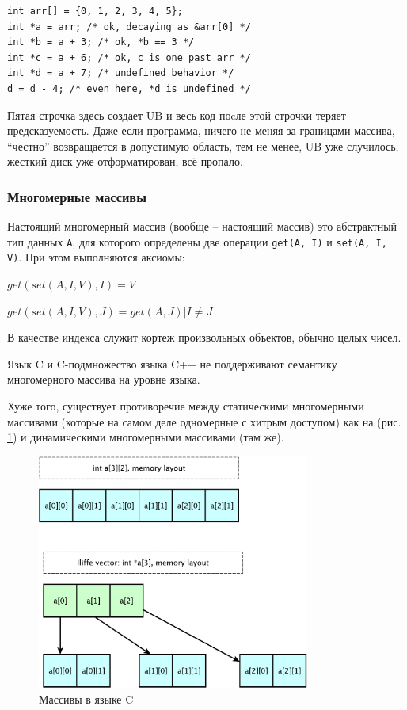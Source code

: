 \documentclass[a4paper,12pt,oneside]{article}
\begin{document}
\begin{lstlisting}
int arr[] = {0, 1, 2, 3, 4, 5};
int *a = arr; /* ok, decaying as &arr[0] */
int *b = a + 3; /* ok, *b == 3 */
int *c = a + 6; /* ok, c is one past arr */
int *d = a + 7; /* undefined behavior */
d = d - 4; /* even here, *d is undefined */
\end{lstlisting}

Пятая строчка здесь создает UB и весь код поcле этой строчки теряет предсказуемость. Даже если программа, ничего не меняя за границами массива, ``честно'' возвращается в допустимую область, тем не менее, UB уже случилось, жесткий диск уже отформатирован, всё пропало.

\subsubsection{Многомерные массивы}\label{MultiDimArr}

Настоящий многомерный массив (вообще -- настоящий массив) это абстрактный тип данных \lstinline!A!, для которого определены две операции \lstinline!get(A, I)! и \lstinline!set(A, I, V)!. При этом выполняются аксиомы:

$get(set(A,I,V),I)=V$

$get(set(A,I,V),J)=get(A,J)|I \neq J$

В качестве индекса служит кортеж произвольных объектов, обычно целых чисел.

Язык C и C-подмножество языка C++ не поддерживают семантику многомерного массива на уровне языка.

Хуже того, существует противоречие между статическими многомерными массивами (которые на самом деле одномерные с хитрым доступом) как на (рис. \ref{fig:c_arrays}) и динамическими многомерными массивами (там же).

\begin{figure}[h!]
\centering
\includegraphics[width=0.8\textwidth]{illustrations/arraylayout-crop.pdf}
\caption{Массивы в языке C}
\label{fig:c_arrays}
\end{figure}
\end{document}
